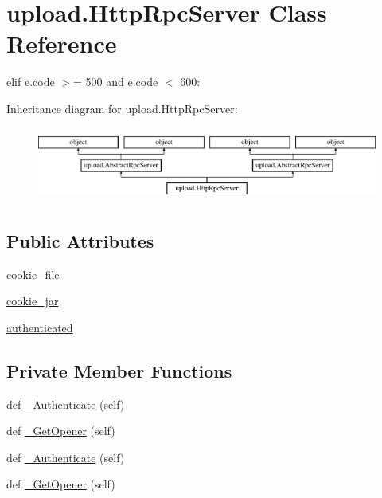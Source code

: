 \hypertarget{classupload_1_1_http_rpc_server}{}\section{upload.\+Http\+Rpc\+Server Class Reference}
\label{classupload_1_1_http_rpc_server}


elif e.\+code $>$= 500 and e.\+code $<$ 600\+:  


Inheritance diagram for upload.\+Http\+Rpc\+Server\+:\begin{figure}[H]
\begin{center}
\leavevmode
\includegraphics[height=2.470588cm]{d4/da7/classupload_1_1_http_rpc_server}
\end{center}
\end{figure}
\subsection*{Public Attributes}
\begin{DoxyCompactItemize}
\item 
\mbox{\hyperlink{classupload_1_1_http_rpc_server_ad5c1a730c030f9d3b5f70c2e0d8b9a1d}{cookie\+\_\+file}}
\item 
\mbox{\hyperlink{classupload_1_1_http_rpc_server_a1b9c9af7f0a46afd84a9d524782323bf}{cookie\+\_\+jar}}
\item 
\mbox{\hyperlink{classupload_1_1_http_rpc_server_aaa356e2491537dd0d4bfc5b1bb0fec96}{authenticated}}
\end{DoxyCompactItemize}
\subsection*{Private Member Functions}
\begin{DoxyCompactItemize}
\item 
def \mbox{\hyperlink{classupload_1_1_http_rpc_server_ab46a30c5aaa9f4d8f5a4bcb32293010e}{\+\_\+\+Authenticate}} (self)
\item 
def \mbox{\hyperlink{classupload_1_1_http_rpc_server_a4685030df704ec17f020c8790108a05a}{\+\_\+\+Get\+Opener}} (self)
\item 
def \mbox{\hyperlink{classupload_1_1_http_rpc_server_ab46a30c5aaa9f4d8f5a4bcb32293010e}{\+\_\+\+Authenticate}} (self)
\item 
def \mbox{\hyperlink{classupload_1_1_http_rpc_server_a4685030df704ec17f020c8790108a05a}{\+\_\+\+Get\+Opener}} (self)
\end{DoxyCompactItemize}
